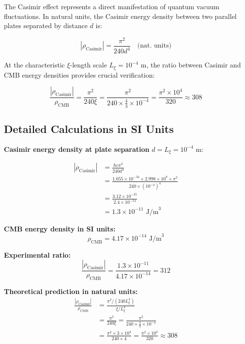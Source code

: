 \documentclass[12pt,a4paper]{article}
\theoremstyle{definition}
\theoremstyle{remark}
\begin{document}
	The Casimir effect represents a direct manifestation of quantum vacuum fluctuations. In natural units, the Casimir energy density between two parallel plates separated by distance $d$ is:
	
	\begin{equation}
		|\rho_{\text{Casimir}}| = \frac{\pi^2}{240 d^4} \quad \text{(nat. units)}
	\end{equation}
	
	At the characteristic $\xi$-length scale $L_\xi = 10^{-4}$ m, the ratio between Casimir and CMB energy densities provides crucial verification:
	
	\begin{equation}
		\frac{|\rho_{\text{Casimir}}|}{\rho_{\text{CMB}}} = \frac{\pi^2}{240 \xi} = \frac{\pi^2}{240 \times \frac{4}{3} \times 10^{-4}} = \frac{\pi^2 \times 10^4}{320} \approx 308
	\end{equation}
	
	\subsection{Detailed Calculations in SI Units}
	
	\textbf{Casimir energy density at plate separation} $d = L_\xi = 10^{-4}$ m:
	
	\begin{align}
		|\rho_{\text{Casimir}}| &= \frac{\hbar c \pi^2}{240 d^4} \\
		&= \frac{1.055 \times 10^{-34} \times 2.998 \times 10^8 \times \pi^2}{240 \times (10^{-4})^4} \\
		&= \frac{3.12 \times 10^{-25}}{2.4 \times 10^{-14}} \\
		&= 1.3 \times 10^{-11} \text{ J/m}^3
	\end{align}
	
	\textbf{CMB energy density in SI units:}
	\begin{equation}
		\rho_{\text{CMB}} = 4.17 \times 10^{-14} \text{ J/m}^3
	\end{equation}
	
	\textbf{Experimental ratio:}
	\begin{equation}
		\frac{|\rho_{\text{Casimir}}|}{\rho_{\text{CMB}}} = \frac{1.3 \times 10^{-11}}{4.17 \times 10^{-14}} = 312
	\end{equation}
	
	\textbf{Theoretical prediction in natural units:}
	\begin{align}
		\frac{|\rho_{\text{Casimir}}|}{\rho_{\text{CMB}}} &= \frac{\pi^2 / (240 L_\xi^4)}{\xi / L_\xi^4} \\
		&= \frac{\pi^2}{240 \xi} = \frac{\pi^2}{240 \times \frac{4}{3} \times 10^{-4}} \\
		&= \frac{\pi^2 \times 3 \times 10^4}{240 \times 4} = \frac{\pi^2 \times 10^4}{320} \approx 308
	\end{align}
	
\end{document}
